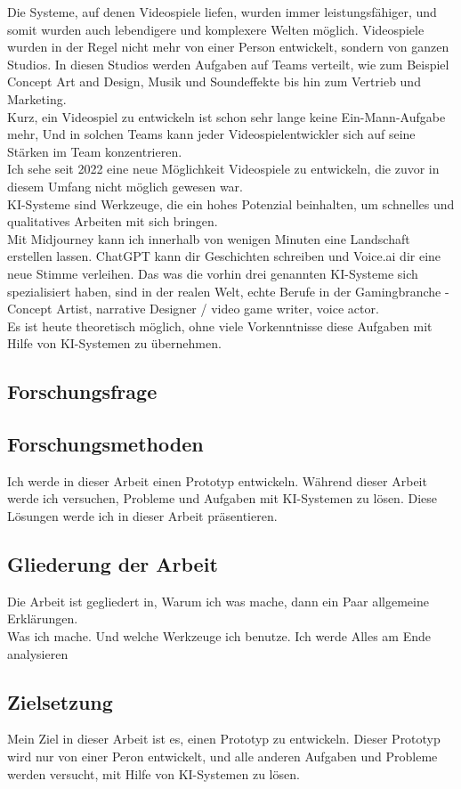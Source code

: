 \documentclass[10pt,a4paper,bibliography=totocnumbered,listof=totocnumbered]{scrartcl}
\begin{document}
Die Systeme, auf denen Videospiele liefen, wurden immer leistungsfähiger, und somit wurden auch lebendigere und komplexere Welten möglich. Videospiele wurden in der Regel nicht mehr von einer Person entwickelt, sondern von ganzen Studios. In diesen Studios werden Aufgaben auf Teams verteilt, wie zum Beispiel Concept Art and Design, Musik und Soundeffekte bis hin zum Vertrieb und Marketing.
\\
Kurz, ein Videospiel zu entwickeln ist schon sehr lange keine Ein-Mann-Aufgabe mehr, Und in solchen Teams kann jeder Videospielentwickler sich auf seine Stärken im Team konzentrieren.
\\
Ich sehe seit 2022 eine neue Möglichkeit Videospiele zu entwickeln, die zuvor in diesem Umfang nicht möglich gewesen war.
\\
KI-Systeme sind Werkzeuge, die ein hohes Potenzial beinhalten, um schnelles und qualitatives Arbeiten mit sich bringen.
\\
Mit Midjourney kann ich innerhalb von wenigen Minuten eine Landschaft erstellen lassen. ChatGPT kann dir Geschichten schreiben und Voice.ai dir eine neue Stimme verleihen. Das was die vorhin drei genannten KI-Systeme sich spezialisiert haben, sind in der realen
Welt, echte Berufe in der Gamingbranche - Concept Artist, narrative Designer / video game writer, voice actor.
\\
Es ist heute theoretisch möglich, ohne viele Vorkenntnisse diese Aufgaben mit Hilfe von KI-Systemen zu übernehmen.
\subsection{Forschungsfrage}
\subsection{Forschungsmethoden}
Ich werde in dieser Arbeit einen Prototyp entwickeln. Während dieser Arbeit werde ich versuchen, Probleme und Aufgaben mit KI-Systemen zu lösen. Diese Lösungen werde ich in dieser Arbeit präsentieren.
\subsection{Gliederung der Arbeit}%
Die Arbeit ist gegliedert in, Warum ich was mache, dann ein Paar allgemeine Erklärungen.
\\
Was ich mache. Und welche Werkzeuge ich benutze. Ich werde Alles am Ende analysieren
\subsection{Zielsetzung}
Mein Ziel in dieser Arbeit ist es, einen Prototyp zu entwickeln. Dieser Prototyp wird nur von einer Peron entwickelt, und alle anderen Aufgaben und Probleme werden versucht, mit Hilfe von KI-Systemen zu lösen.
\end{document}
